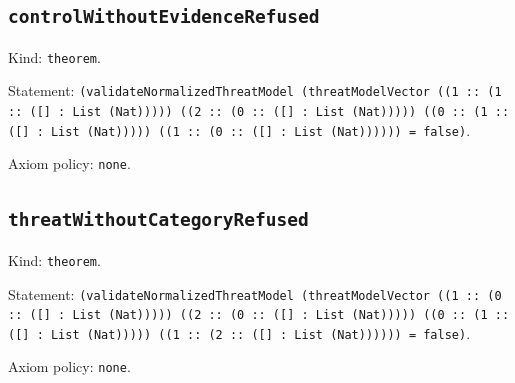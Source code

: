 \documentclass[11pt]{article}
\begin{document}
\subsection*{\texttt{controlWithoutEvidenceRefused}}
\noindent Kind: \texttt{theorem}.\par
\noindent Statement: \texttt{(validateNormalizedThreatModel (threatModelVector ((1 :: (1 :: ([] : List (Nat))))) ((2 :: (0 :: ([] : List (Nat))))) ((0 :: (1 :: ([] : List (Nat))))) ((1 :: (0 :: ([] : List (Nat)))))) = false)}.\par
\noindent Axiom policy: \texttt{none}.\par
\subsection*{\texttt{threatWithoutCategoryRefused}}
\noindent Kind: \texttt{theorem}.\par
\noindent Statement: \texttt{(validateNormalizedThreatModel (threatModelVector ((1 :: (0 :: ([] : List (Nat))))) ((2 :: (0 :: ([] : List (Nat))))) ((0 :: (1 :: ([] : List (Nat))))) ((1 :: (2 :: ([] : List (Nat)))))) = false)}.\par
\noindent Axiom policy: \texttt{none}.\par
\end{document}
